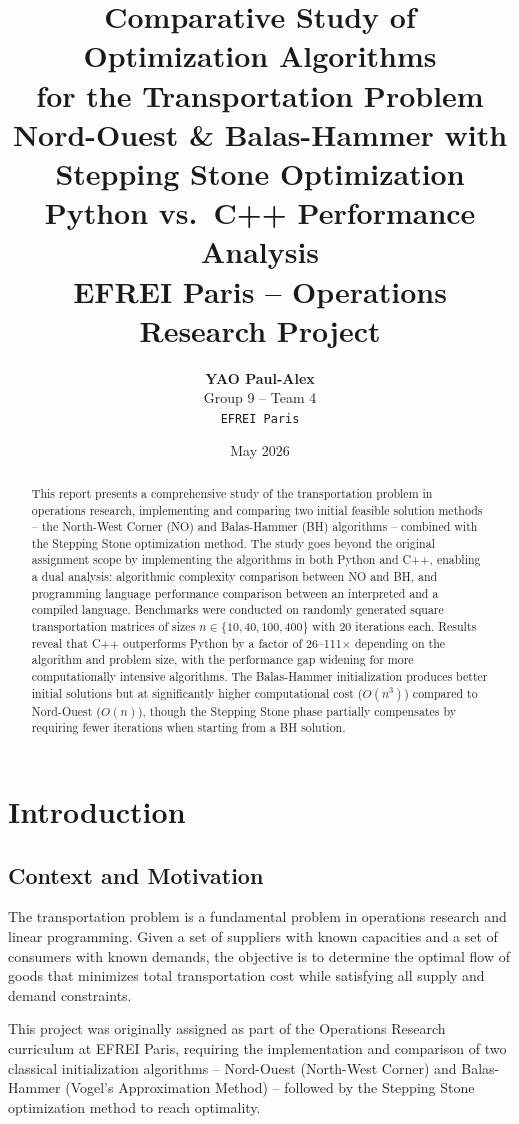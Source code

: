 \documentclass[12pt,a4paper]{article}
\title{
  \vspace{-1cm}
  \textbf{Comparative Study of Optimization Algorithms\\for the Transportation Problem}\\[0.5cm]
  \large Nord-Ouest \& Balas-Hammer with Stepping Stone Optimization\\
  Python vs.\ C++ Performance Analysis\\[0.5cm]
  \normalsize EFREI Paris -- Operations Research Project
}
\author{
  \textbf{YAO Paul-Alex}\\
  Group 9 -- Team 4\\
  \texttt{EFREI Paris}
}
\date{May 2026}
\begin{document}
\maketitle
\thispagestyle{empty}

\begin{abstract}
This report presents a comprehensive study of the transportation problem in operations research, implementing and comparing two initial feasible solution methods -- the North-West Corner (NO) and Balas-Hammer (BH) algorithms -- combined with the Stepping Stone optimization method. The study goes beyond the original assignment scope by implementing the algorithms in both Python and C++, enabling a dual analysis: algorithmic complexity comparison between NO and BH, and programming language performance comparison between an interpreted and a compiled language. Benchmarks were conducted on randomly generated square transportation matrices of sizes $n \in \{10, 40, 100, 400\}$ with 20 iterations each. Results reveal that C++ outperforms Python by a factor of 26--111$\times$ depending on the algorithm and problem size, with the performance gap widening for more computationally intensive algorithms. The Balas-Hammer initialization produces better initial solutions but at significantly higher computational cost ($O(n^3)$) compared to Nord-Ouest ($O(n)$), though the Stepping Stone phase partially compensates by requiring fewer iterations when starting from a BH solution.
\end{abstract}

\tableofcontents
\newpage

\section{Introduction}

\subsection{Context and Motivation}

The transportation problem is a fundamental problem in operations research and linear programming. Given a set of suppliers with known capacities and a set of consumers with known demands, the objective is to determine the optimal flow of goods that minimizes total transportation cost while satisfying all supply and demand constraints.

This project was originally assigned as part of the Operations Research curriculum at EFREI Paris, requiring the implementation and comparison of two classical initialization algorithms -- Nord-Ouest (North-West Corner) and Balas-Hammer (Vogel's Approximation Method) -- followed by the Stepping Stone optimization method to reach optimality.
\end{document}
